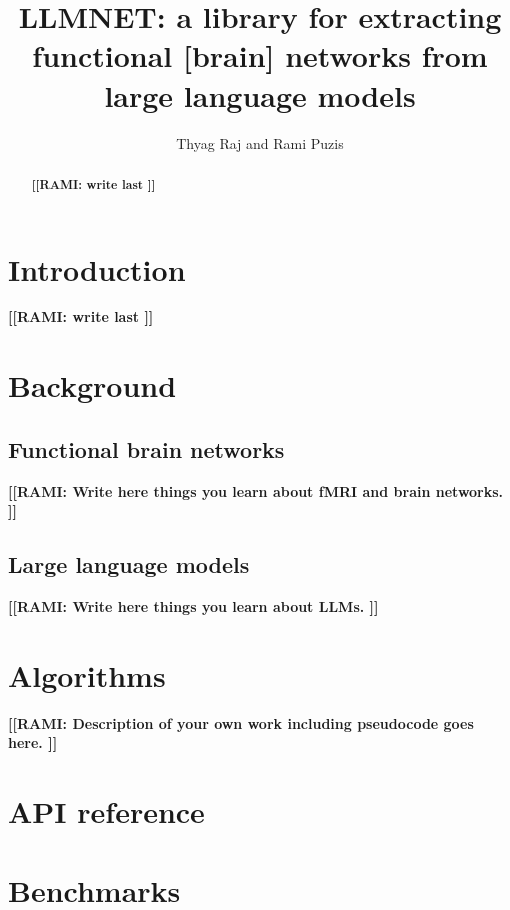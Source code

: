\documentclass{article}
\title{LLMNET: a library for extracting functional [brain] networks from large language models}
\author{Thyag Raj and Rami Puzis}
\newcommand{\rami}[1]{\textbf{\color{red}[[RAMI: #1 ]]}}
\begin{document}
\maketitle


\begin{abstract}
\rami{write last}   
\end{abstract}

\section{Introduction}
\rami{write last}   




\section{Background}
\subsection{Functional brain networks}
\rami{Write here things you learn about fMRI and brain networks.}


\subsection{Large language models}
\rami{Write here things you learn about LLMs.}


\section{Algorithms}
\rami{Description of your own work including pseudocode goes here.}


\section{API reference}


\section{Benchmarks}






\end{document}
